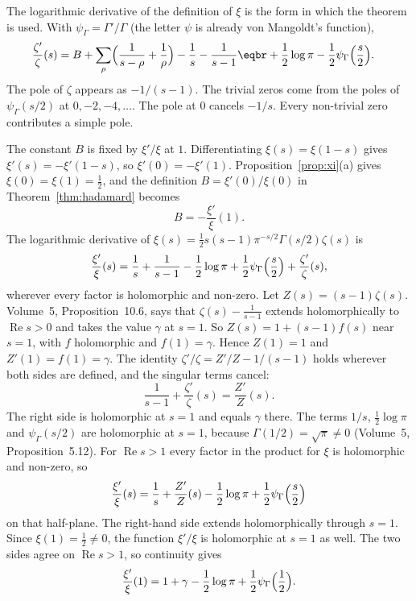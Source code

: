 The logarithmic derivative of the definition of $\xi$ is the form in which the theorem is used. With $\psi_\Gamma=\Gamma'/\Gamma$ (the letter $\psi$ is already von Mangoldt's function),
\begin{equation}\label{eq:zetapf}
\begin{aligned}\frac{\zeta'}{\zeta}(s)&=B+\sum_\rho\Bigl(\frac1{s-\rho}+\frac1\rho\Bigr)-\frac1s-\frac1{s-1}\eqbr+\frac12\log\pi-\frac12\psi_\Gamma\Bigl(\frac s2\Bigr).\end{aligned}
\end{equation}
The pole of $\zeta$ appears as $-1/(s-1)$. The trivial zeros come from the poles of $\psi_\Gamma(s/2)$ at $0,-2,-4,\dots$. The pole at $0$ cancels $-1/s$. Every non-trivial zero contributes a simple pole.

The constant $B$ is fixed by $\xi'/\xi$ at $1$. Differentiating $\xi(s)=\xi(1-s)$ gives $\xi'(s)=-\xi'(1-s)$, so $\xi'(0)=-\xi'(1)$. Proposition~\ref{prop:xi}(a) gives $\xi(0)=\xi(1)=\frac12$, and the definition $B=\xi'(0)/\xi(0)$ in Theorem~\ref{thm:hadamard} becomes
\[
B=-\frac{\xi'}{\xi}(1).
\]
The logarithmic derivative of $\xi(s)=\frac12 s(s-1)\pi^{-s/2}\Gamma(s/2)\zeta(s)$ is
\[
\frac{\xi'}{\xi}(s)=\frac1s+\frac1{s-1}-\frac12\log\pi+\frac12\psi_\Gamma\Bigl(\frac s2\Bigr)+\frac{\zeta'}{\zeta}(s),
\]
wherever every factor is holomorphic and non-zero. Let $Z(s)=(s-1)\zeta(s)$. Volume~5, Proposition~10.6, says that $\zeta(s)-\frac1{s-1}$ extends holomorphically to $\operatorname{Re}s>0$ and takes the value $\gamma$ at $s=1$. So $Z(s)=1+(s-1)f(s)$ near $s=1$, with $f$ holomorphic and $f(1)=\gamma$. Hence $Z(1)=1$ and $Z'(1)=f(1)=\gamma$. The identity $\zeta'/\zeta=Z'/Z-1/(s-1)$ holds wherever both sides are defined, and the singular terms cancel:
\[
\frac1{s-1}+\frac{\zeta'}{\zeta}(s)=\frac{Z'}{Z}(s).
\]
The right side is holomorphic at $s=1$ and equals $\gamma$ there. The terms $1/s$, $\frac12\log\pi$ and $\psi_\Gamma(s/2)$ are holomorphic at $s=1$, because $\Gamma(1/2)=\sqrt\pi\ne0$ (Volume~5, Proposition~5.12). For $\operatorname{Re}s>1$ every factor in the product for $\xi$ is holomorphic and non-zero, so
\[
\frac{\xi'}{\xi}(s)=\frac1s+\frac{Z'}{Z}(s)-\frac12\log\pi+\frac12\psi_\Gamma\Bigl(\frac s2\Bigr)
\]
on that half-plane. The right-hand side extends holomorphically through $s=1$. Since $\xi(1)=\frac12\ne0$, the function $\xi'/\xi$ is holomorphic at $s=1$ as well. The two sides agree on $\operatorname{Re}s>1$, so continuity gives
\[
\frac{\xi'}{\xi}(1)=1+\gamma-\frac12\log\pi+\frac12\psi_\Gamma\Bigl(\frac12\Bigr).
\]


